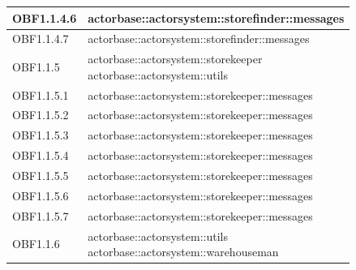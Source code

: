 \documentclass{scalatekids-article}
\begin{document}
\begin{longtable}[H]{|p{6cm}|p{11cm}|}
\hline
OBF1.1.4.6 & \multiLineCell[t]{actorbase::actorsystem::storefinder::messages\\}\\
\hline
OBF1.1.4.7 & \multiLineCell[t]{actorbase::actorsystem::storefinder::messages\\}\\
\hline
OBF1.1.5 & \multiLineCell[t]{actorbase::actorsystem::storekeeper\\actorbase::actorsystem::utils\\}\\
\hline
OBF1.1.5.1 & \multiLineCell[t]{actorbase::actorsystem::storekeeper::messages\\}\\
\hline
OBF1.1.5.2 & \multiLineCell[t]{actorbase::actorsystem::storekeeper::messages\\}\\
\hline
OBF1.1.5.3 & \multiLineCell[t]{actorbase::actorsystem::storekeeper::messages\\}\\
\hline
OBF1.1.5.4 & \multiLineCell[t]{actorbase::actorsystem::storekeeper::messages\\}\\
\hline
OBF1.1.5.5 & \multiLineCell[t]{actorbase::actorsystem::storekeeper::messages\\}\\
\hline
OBF1.1.5.6 & \multiLineCell[t]{actorbase::actorsystem::storekeeper::messages\\}\\
\hline
OBF1.1.5.7 & \multiLineCell[t]{actorbase::actorsystem::storekeeper::messages\\}\\
\hline
OBF1.1.6 & \multiLineCell[t]{actorbase::actorsystem::utils\\actorbase::actorsystem::warehouseman\\}\\

\end{longtable}
\end{document}
